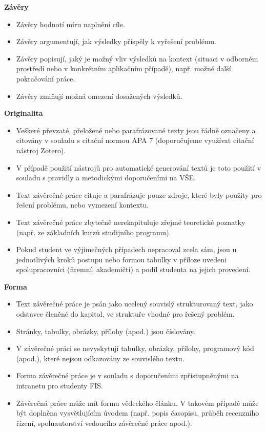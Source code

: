 {\bfseries\sffamily\Large Závěry}
\begin{itemize}
\item \vspace*{-2ex}Závěry hodnotí míru naplnění cíle.
\item Závěry argumentují, jak výsledky přispěly k vyřešení problému.
\item Závěry popisují, jaký je možný vliv výsledků na kontext (situaci v odborném prostředí nebo v konkrétním aplikačním případě), např. možné další pokračování práce.
\item Závěry zmiňují možná omezení dosažených výsledků.
\end{itemize}

{\bfseries\sffamily\Large Originalita}
\begin{itemize}
\item \vspace*{-2ex}Veškeré převzaté, přeložené nebo parafrázované texty jsou řádně označeny a citovány v souladu s citační normou APA 7 (doporučujeme využívat citační nástroj Zotero).
\item V případě použití nástrojů pro automatické generování textů je toto použití v souladu s pravidly a metodickými doporučeními na VŠE.
\item Text závěrečné práce cituje a parafrázuje pouze zdroje, které byly použity pro řešení problému, nebo vymezení kontextu.
\item Text závěrečné práce zbytečně nerekapituluje zřejmé teoretické poznatky (např. ze základních kurzů studijního programu).
\item Pokud student ve výjimečných případech nepracoval zcela sám, jsou u jednotlivých kroků postupu nebo formou tabulky v příloze uvedeni spolupracovníci (firemní, akademičtí) a podíl studenta na jejich provedení.
\end{itemize}

{\bfseries\sffamily\Large Forma}
\begin{itemize}
\item \vspace*{-2ex}Text závěrečné práce je psán jako ucelený souvislý strukturovaný text, jako odstavce členěné do kapitol, ve struktuře vhodné pro řešený problém.
\item Stránky, tabulky, obrázky, přílohy (apod.) jsou číslovány.
\item V závěrečné práci se nevyskytují tabulky, obrázky, přílohy, programový kód (apod.), které nejsou odkazovány ze souvislého textu.
\item Forma závěrečné práce je v souladu s doporučeními zpřístupněnými na intranetu pro studenty FIS.
\item Závěrečná práce může mít formu vědeckého článku. V takovém případě může být doplněna vysvětlujícím úvodem (např. popis časopisu, průběh recenzního řízení, spoluautorství vedoucího závěrečné práce apod.).
\end{itemize}

